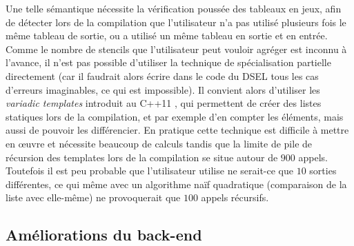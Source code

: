 Une telle sémantique nécessite la vérification poussée des tableaux en jeux, afin de détecter lors de la compilation que l'utilisateur n'a pas utilisé plusieurs fois le même tableau de sortie, ou a utilisé un même tableau en sortie et en entrée. Comme le nombre de stencils que l'utilisateur peut vouloir agréger est inconnu à l'avance, il n'est pas possible d'utiliser la technique de spécialisation partielle directement (car il faudrait alors écrire dans le code du DSEL tous les cas d'erreurs imaginables, ce qui est impossible). Il convient alors d'utiliser les \emph{variadic templates} introduit au \textsf{C++11} \cite{Art6}, qui permettent de créer des listes statiques lors de la compilation, et par exemple d'en compter les éléments, mais aussi de pouvoir les différencier. En pratique cette technique est difficile à mettre en œuvre et nécessite beaucoup de calculs tandis que la limite de pile de récursion des templates lors de la compilation se situe autour de $900$ appels. Toutefois il est peu probable que l'utilisateur utilise ne serait-ce que $10$ sorties différentes, ce qui même avec un algorithme naïf quadratique (comparaison de la liste avec elle-même) ne provoquerait que $100$ appels récursifs.


\subsection{Améliorations du back-end}
\label{sec:amelior_backend}

